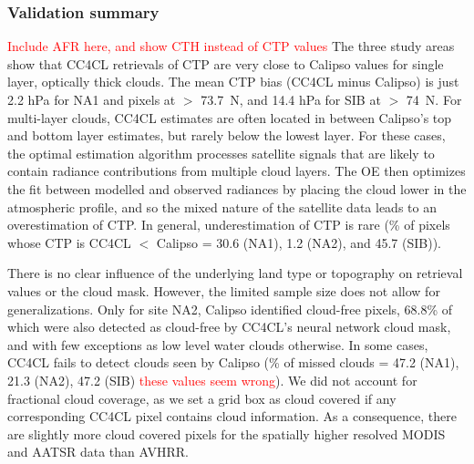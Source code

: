 \subsubsection{Validation summary}

\textcolor{red}{Include AFR here, and show CTH instead of CTP values} The three study areas show that CC4CL retrievals of CTP are very close to Calipso values for single layer, optically thick clouds. The mean CTP bias (CC4CL minus Calipso) is just 2.2 hPa for NA1 and pixels at $>$ 73.7\textdegree\ N, and 14.4 hPa for SIB at $>$ 74\textdegree\ N. For multi-layer clouds, CC4CL estimates are often located in between Calipso's top and bottom layer estimates, but rarely below the lowest layer. For these cases, the optimal estimation algorithm processes satellite signals that are likely to contain radiance contributions from multiple cloud layers. The OE then optimizes the fit between modelled and observed radiances by placing the cloud lower in the atmospheric profile, and so the mixed nature of the satellite data leads to an overestimation of CTP. In general, underestimation of CTP is rare (\% of pixels whose CTP is CC4CL $<$ Calipso = 30.6 (NA1), 1.2 (NA2), and 45.7 (SIB)).

There is no clear influence of the underlying land type or topography on retrieval values or the cloud mask. However, the limited sample size does not allow for generalizations. Only for site NA2, Calipso identified cloud-free pixels, 68.8\% of which were also detected as cloud-free by CC4CL's neural network cloud mask, and with few exceptions as low level water clouds otherwise. In some cases, CC4CL fails to detect clouds seen by Calipso (\% of missed clouds = 47.2 (NA1), 21.3 (NA2), 47.2 (SIB) \textcolor{red}{these values seem wrong}). We did not account for fractional cloud coverage, as we set a grid box as cloud covered if any corresponding CC4CL pixel contains cloud information. As a consequence, there are slightly more cloud covered pixels for the spatially higher resolved MODIS and AATSR data than AVHRR.


